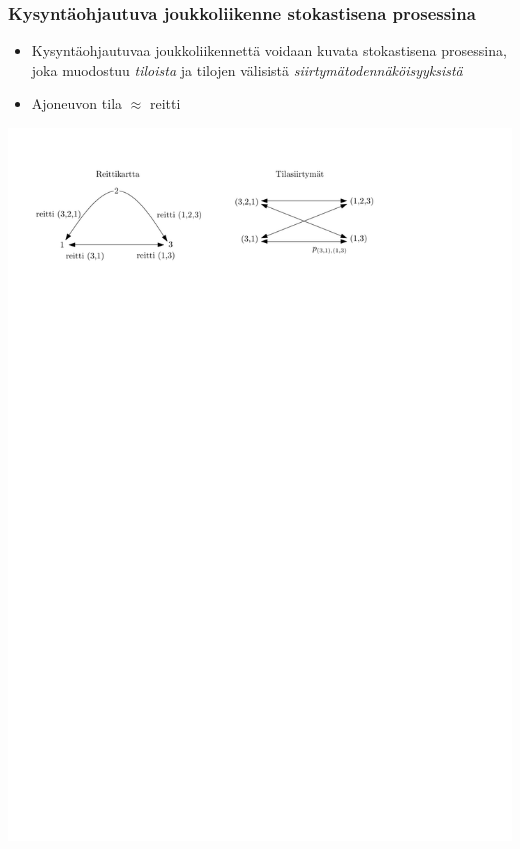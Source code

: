 \documentclass{beamer}
\begin{document}
    \begin{frame}
  \frametitle{Kysyntäohjautuva joukkoliikenne stokastisena prosessina}   %
\begin{itemize}
 \item 
 Kysyntäohjautuvaa joukkoliikennettä voidaan kuvata stokastisena prosessina, joka muodostuu
 \emph{tiloista} ja tilojen välisistä \emph{siirtymätodennäköisyyksistä}
 \item
 Ajoneuvon tila $\approx$ reitti %
\end{itemize}
\begin{center}
 \includegraphics[scale=0.65]{tilat01}
\end{center}
\end{frame}
\end{document}
